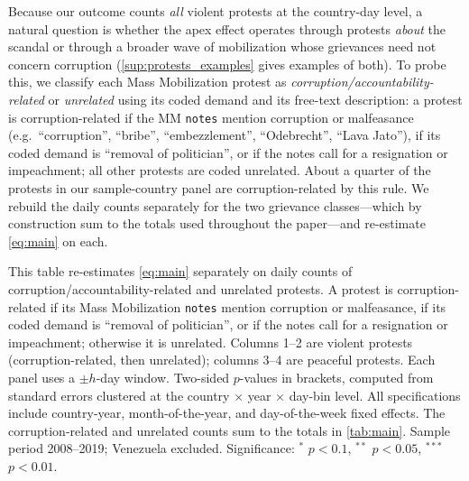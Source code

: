 \documentclass[11pt]{article}
\begin{document}
Because our outcome counts \emph{all} violent protests at the country-day level, a natural question is whether the apex effect operates through protests \emph{about} the scandal or through a broader wave of mobilization whose grievances need not concern corruption (\autoref{sup:protests_examples} gives examples of both). To probe this, we classify each Mass Mobilization protest as \emph{corruption/accountability-related} or \emph{unrelated} using its coded demand and its free-text description: a protest is corruption-related if the MM \texttt{notes} mention corruption or malfeasance (e.g.\ ``corruption'', ``bribe'', ``embezzlement'', ``Odebrecht'', ``Lava Jato''), if its coded demand is ``removal of politician'', or if the notes call for a resignation or impeachment; all other protests are coded unrelated. About a quarter of the protests in our sample-country panel are corruption-related by this rule. We rebuild the daily counts separately for the two grievance classes---which by construction sum to the totals used throughout the paper---and re-estimate \autoref{eq:main} on each.

\begin{table}[htb!]
    \caption{Effect on violent and peaceful protests, split by whether the protest's grievance is corruption-related.}
    \label{tab:grievance_split}
    \begin{center}
        \scriptsize{}
    \end{center}
    \footnotesize{This table re-estimates \autoref{eq:main} separately on daily counts of corruption/accountability-related and unrelated protests. A protest is corruption-related if its Mass Mobilization \texttt{notes} mention corruption or malfeasance, if its coded demand is ``removal of politician'', or if the notes call for a resignation or impeachment; otherwise it is unrelated. Columns 1--2 are violent protests (corruption-related, then unrelated); columns 3--4 are peaceful protests. Each panel uses a $\pm h$-day window. Two-sided $p$-values in brackets, computed from standard errors clustered at the country $\times$ year $\times$ day-bin level. All specifications include country-year, month-of-the-year, and day-of-the-week fixed effects. The corruption-related and unrelated counts sum to the totals in \autoref{tab:main}. Sample period 2008--2019; Venezuela excluded. Significance: $^{*}$ $p<0.1$, $^{**}$ $p<0.05$, $^{***}$ $p<0.01$.}
\end{table}
\end{document}
